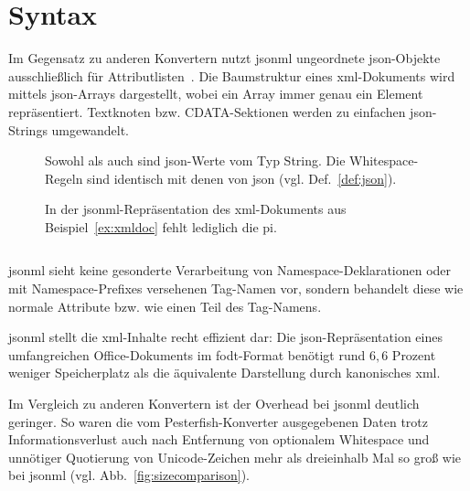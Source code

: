 \section{Syntax}
\label{sec:jsonml-syntax}

Im Gegensatz zu anderen Konvertern nutzt \acrshort{jsonml} ungeordnete \acrshort{json}-Objekte ausschließlich für Attributlisten~\cite{jsonmlsyntax}. Die Baumstruktur eines \acrshort{xml}-Dokuments wird mittels \acrshort{json}-Arrays dargestellt, wobei ein Array immer genau ein Element repräsentiert. Textknoten bzw. CDATA-Sektionen werden zu einfachen \acrshort{json}-Strings umgewandelt.

\begin{figure}[H]
    \begin{definition}
        \label{def:jsonml}
        Sowohl  als auch  sind \acrshort{json}-Werte vom Typ String. Die Whitespace-Regeln sind identisch mit denen von \acrshort{json} (vgl. Def.~\ref{def:json}).
        \begin{grammar}
            
        \end{grammar}
    \end{definition}
\end{figure}

\begin{figure}[h]
    \begin{example}
        In der \acrshort{jsonml}-Repräsentation des \acrshort{xml}-Dokuments aus Beispiel~\ref{ex:xmldoc} fehlt lediglich die \acrlong{pi}.
        \inputminted{json}{xmltree.json}
        \label{fig:xmltreejsonml}
    \end{example}
\end{figure}

\acrshort{jsonml} sieht keine gesonderte Verarbeitung von Namespace-Deklarationen oder mit Namespace-Prefixes versehenen Tag-Namen vor, sondern behandelt diese wie normale Attribute bzw. wie einen Teil des Tag-Namens.

\acrshort{jsonml} stellt die \acrshort{xml}-Inhalte recht effizient dar: Die \acrshort{json}-Repräsentation eines umfangreichen Office-Dokuments im \acrshort{fodt}-Format benötigt rund $6,6$ Prozent weniger Speicherplatz als die äquivalente Darstellung durch kanonisches \acrshort{xml}.

Im Vergleich zu anderen Konvertern ist der Overhead bei \acrshort{jsonml} deutlich geringer. So waren die vom Pesterfish-Konverter ausgegebenen Daten trotz Informationsverlust auch nach Entfernung von optionalem Whitespace und unnötiger Quotierung von Unicode-Zeichen mehr als dreieinhalb Mal so groß wie bei \acrshort{jsonml} (vgl. Abb.~\ref{fig:sizecomparison}).


